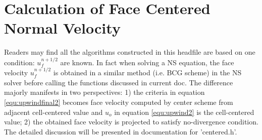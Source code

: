 \documentclass[a4paper]{article}
\begin{document}
\section{Calculation of Face Centered Normal Velocity}
Readers may find all the algorithms constructed in this headfile are based on one condition: $u_f^{n+1/2}$ are known. In fact when solving a NS equation, the face velocity $u_f^{n+1/2}$ is obtained in a similar method (i.e. BCG scheme) in the NS solver before calling the functions discussed in current doc\cite{2003_popinet}. The difference majorly manifests in two perspectives: 1) the criteria in equation \ref{equ:upwindfinal2} becomes face velocity computed by center scheme from adjacent cell-centered value and $u_o$ in equation \ref{equ:upwind2} is the cell-centered value; 2) the obtained face velocity is projected to satisfy no-divergence condition. The detailed discussion will be presented in documentation for 'centered.h'.
\printbibliography
\end{document}
